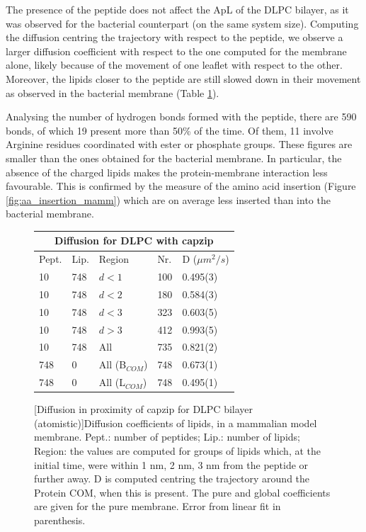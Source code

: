The presence of the peptide does not affect the ApL of the DLPC bilayer, as it was observed for the bacterial counterpart (on the same system size). Computing the diffusion centring the trajectory with respect to the peptide, we observe a larger diffusion coefficient with respect to the one computed for the membrane alone, likely because of the movement of one leaflet with respect to the other. Moreover, the lipids closer to the peptide are still slowed down in their movement as observed in the bacterial membrane (Table \ref{table:dlpc_D_space}).

Analysing the number of hydrogen bonds formed with the peptide, there are 590 bonds, of which 19 present more than 50\% of the time. Of them, 11 involve Arginine residues coordinated with ester or phosphate groups. These figures are smaller than the ones obtained for the bacterial membrane. In particular, the absence of the charged lipids makes the protein-membrane interaction less favourable. This is confirmed by the measure of the amino acid insertion (Figure \ref{fig:aa_insertion_mamm}) which are on average less inserted than into the bacterial membrane.

\begin{figure}[t!]
\centering
 \def\arraystretch{1.6}
\begin{tabular}{lllll}
 \multicolumn{5}{c}{\textbf{Diffusion for DLPC with capzip}} \\
 \hline
Pept. & Lip. & Region & Nr. & D ($\mu m^2/s$) \\
 \hline
10 & 748 & $d<1$ & 100 & 0.495(3) \\
10 & 748 & $d<2$ & 180 & 0.584(3) \\
10 & 748 & $d<3$ & 323 & 0.603(5) \\
10 & 748 & $d>3$ & 412 & 0.993(5) \\
10 & 748 & All & 735 & 0.821(2) \\
 \hline
 748 & 0 & All (B$_{COM}$) & 748 & 0.673(1) \\
 748 & 0 & All (L$_{COM}$) & 748 & 0.495(1) \\
 \hline
 \end{tabular}
[Diffusion in proximity of capzip for DLPC bilayer (atomistic)]{Diffusion coefficients of lipids, in a mammalian model membrane. Pept.: number of peptides; Lip.: number of lipids; Region: the values are computed for groups of lipids which, at the initial time, were within 1 nm, 2 nm, 3 nm from the peptide or further away. D is computed centring the trajectory around the Protein COM, when this is present. The pure and global coefficients are given for the pure membrane. Error from linear fit in parenthesis.}
\label{table:dlpc_D_space}
\end{figure}

